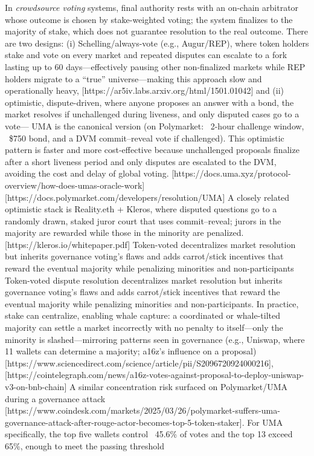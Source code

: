 In \textit{crowdsource voting} systems, final authority rests with an on-chain arbitrator whose outcome is chosen by stake-weighted voting; the system finalizes to the majority of stake, which does not guarantee resolution to the real outcome. There are two designs: (i) Schelling/always-vote (e.g., Augur/REP), where token holders stake and vote on every market and repeated disputes can escalate to a fork lasting up to 60 days—effectively pausing other non-finalized markets while REP holders migrate to a “true” universe—making this approach slow and operationally heavy, [https://ar5iv.labs.arxiv.org/html/1501.01042] and (ii) optimistic, dispute-driven, where anyone proposes an answer with a bond, the market resolves if unchallenged during liveness, and only disputed cases go to a vote— UMA is the canonical version (on Polymarket: ~2-hour challenge window, ~\$750 bond, and a DVM commit–reveal vote if challenged). This optimistic pattern is faster and more cost-effective because unchallenged proposals finalize after a short liveness period and only disputes are escalated to the DVM, avoiding the cost and delay of global voting.
[https://docs.uma.xyz/protocol-overview/how-does-umas-oracle-work]
[https://docs.polymarket.com/developers/resolution/UMA]
A closely related optimistic stack is Reality.eth + Kleros, where disputed questions go to a randomly drawn, staked juror court that uses commit–reveal; jurors in the majority are rewarded while those in the minority are penalized. [https://kleros.io/whitepaper.pdf]
Token-voted decentralizes market resolution but inherits governance voting’s flaws and adds carrot/stick incentives that reward the eventual majority while penalizing minorities and non-participants Token-voted dispute resolution decentralizes market resolution but inherits governance voting’s flaws and adds carrot/stick incentives that reward the eventual majority while penalizing minorities and non-participants. In practice, stake can centralize, enabling whale capture: a coordinated or whale-tilted majority can settle a market incorrectly with no penalty to itself—only the minority is slashed—mirroring patterns seen in governance (e.g., Uniswap, where 11 wallets can determine a majority; a16z’s influence on a proposal) [https://www.sciencedirect.com/science/article/pii/S2096720924000216], [https://cointelegraph.com/news/a16z-votes-against-proposal-to-deploy-uniswap-v3-on-bnb-chain] A similar concentration risk surfaced on Polymarket/UMA during a governance attack [https://www.coindesk.com/markets/2025/03/26/polymarket-suffers-uma-governance-attack-after-rouge-actor-becomes-top-5-token-staker]. For UMA specifically, the top five wallets control ~45.6\% of votes and the top 13 exceed 65\%, enough to meet the passing threshold
